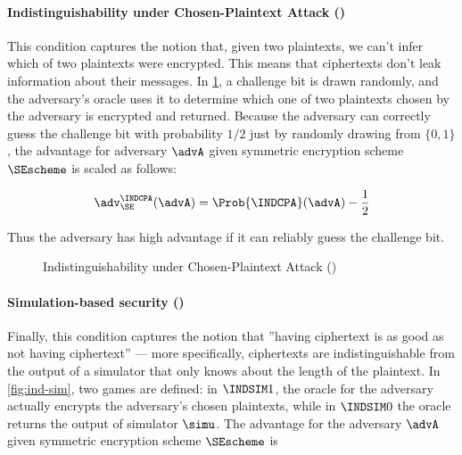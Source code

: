 \paragraph{Indistinguishability under Chosen-Plaintext Attack (\INDCPA)}

This condition captures the notion that, given two plaintexts, we can't infer
which of two plaintexts were encrypted. This means that ciphertexts don't leak
information about their messages. In \cref{fig:ind-cpa}, a challenge bit is
drawn randomly, and the adversary's oracle uses it to determine which one
of two plaintexts chosen by the adversary is encrypted and returned.
Because the adversary can correctly guess the challenge bit with probability
$1/2$ just by randomly drawing from $\{0,1\}$, 
the advantage for adversary $\advA$ given symmetric encryption scheme
$\SEscheme$  is scaled as follows:

$$
\adv_{\SE}^{\INDCPA}(\advA) = \Prob{\INDCPA}(\advA) - \frac{1}{2}
$$

Thus the adversary has high advantage if it can reliably guess the challenge
bit.

\begin{figure}[p]
	\centering
  \caption{Indistinguishability under Chosen-Plaintext Attack (\INDCPA)}
	\label{fig:ind-cpa}
\end{figure} 

\paragraph{Simulation-based security (\INDSIM)}

Finally, this condition captures the notion that
''having ciphertext is as good as not having ciphertext'' --- more specifically,
ciphertexts are indistinguishable from the output of a simulator that only
knows about the length of the plaintext.
In \cref{fig:ind-sim}, two games are defined: in $\INDSIM1$, the oracle for the
adversary actually encrypts the adversary's chosen plaintexts, while in
$\INDSIM0$ the oracle returns the output of simulator $\simu$.
The advantage for the adversary $\advA$ given symmetric
encryption scheme $\SEscheme$ is

